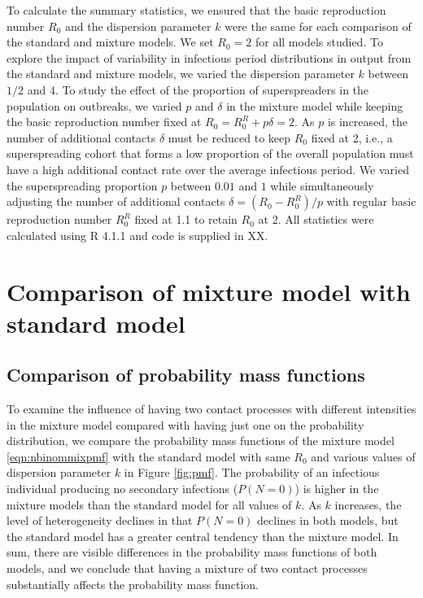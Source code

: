 \documentclass{imammb}
\numberwithin{equation}{section}
\begin{document}
To calculate the summary statistics, we ensured that the basic reproduction number $R_0$ and the dispersion parameter $k$ were the same for each comparison of the standard and mixture models. We set $R_0=2$ for all models studied. To explore the impact of variability in infectious period distributions in output from the standard and mixture models, we varied the dispersion parameter $k$ between $1/2$ and $4$. To study the effect of the proportion of superspreaders in the population on outbreaks,  we varied $p$ and $\delta$ in the mixture model while keeping the basic reproduction number fixed at $R_0 = R_0^R + p \delta = 2$. As $p$ is increased, the number of additional contacts $\delta$ must be reduced to keep $R_0$ fixed at 2, i.e., a superspreading cohort that forms a low proportion of the overall population must have a high additional contact rate over the average infectious period. We varied the superspreading proportion $p$  between $0.01$ and $1$ while simultaneously adjusting the number of additional contacts $\delta = (R_0 -R_0^R)/p$ with regular basic reproduction number $R_0^R$ fixed at 1.1 to retain $R_0$ at 2.  All statistics were calculated using R 4.1.1 and code is supplied in XX. 


\section{Comparison of mixture model with standard model}


\subsection{Comparison of probability mass functions}


To examine the influence of having two contact processes with different intensities in the mixture model compared with having just one on the probability distribution, we compare the probability mass functions of the mixture model \eqref{eqn:nbinommixpmf} with the standard model with same $R_0$ and various values of dispersion parameter $k$ in Figure \ref{fig:pmf}. The probability of an infectious individual producing no secondary infections ($P(N=0)$) is higher in the mixture models than the standard model for all values of $k$. As $k$ increases, the level of heterogeneity declines in that $P(N=0)$ declines in both models, but the standard model has a greater central tendency than the mixture model. In sum, there are visible differences in the probability mass functions of both models, and we conclude that having a mixture of two contact processes substantially affects the probability mass function. 
\end{document}
